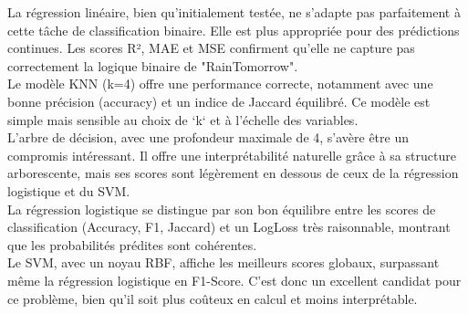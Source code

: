 \documentclass[a4paper,11pt]{article}
\begin{document}
	\indent
	La régression linéaire, bien qu’initialement testée, ne s’adapte pas parfaitement à cette tâche de classification binaire. Elle est plus appropriée pour des prédictions continues. Les scores R², MAE et MSE confirment qu’elle ne capture pas correctement la logique binaire de "RainTomorrow".\\
	
	\indent
	Le modèle KNN (k=4) offre une performance correcte, notamment avec une bonne précision (accuracy) et un indice de Jaccard équilibré. Ce modèle est simple mais sensible au choix de `k` et à l’échelle des variables.\\
	
	
	\indent
	L’arbre de décision, avec une profondeur maximale de 4, s’avère être un compromis intéressant. Il offre une interprétabilité naturelle grâce à sa structure arborescente, mais ses scores sont légèrement en dessous de ceux de la régression logistique et du SVM.\\
	
	\indent
	La régression logistique se distingue par son bon équilibre entre les scores de classification (Accuracy, F1, Jaccard) et un LogLoss très raisonnable, montrant que les probabilités prédites sont cohérentes.\\
	
	\indent
	Le SVM, avec un noyau RBF, affiche les meilleurs scores globaux, surpassant même la régression logistique en F1-Score. C’est donc un excellent candidat pour ce problème, bien qu’il soit plus coûteux en calcul et moins interprétable.
	
\end{document}
